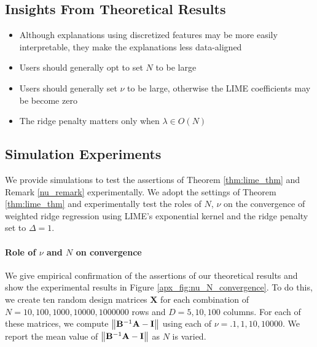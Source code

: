 \documentclass[12pt]{article}  %
\newcommand{\bA}{\mathbf{A}}
\newcommand{\bB}{\mathbf{B}}
\begin{document}
            
        \subsection*{Insights From Theoretical Results}
            \begin{itemize}
                \item Although explanations using discretized features may be more easily interpretable, they make the explanations less data-aligned
                \item Users should generally opt to set $N$ to be large 
                \item Users should generally set $\nu$ to be large, otherwise the LIME coefficients may be become zero
                \item The ridge penalty matters only when $\lambda \in O(N)$
            \end{itemize}
    
            \subsection*{Simulation Experiments}
                \label{apx_sec:simulation_experiments}
                We provide simulations to test the assertions of Theorem \ref{thm:lime_thm} and Remark \ref{nu_remark} experimentally. We adopt the settings of Theorem \ref{thm:lime_thm} and experimentally test the roles of $N$, $\nu$ on the convergence of weighted ridge regression using LIME's exponential kernel and the ridge penalty set to $\Delta=1$.%
    

                
                \paragraph{Role of $\nu$ and $N$ on convergence}
                    We give empirical confirmation of the assertions of our theoretical results and show the experimental results in Figure \ref{apx_fig:nu_N_convergence}. To do this, we create ten random design matrices $\mathbf{X}$ for each combination of $N=10,100,1000,10000,1000000$ rows and $D=5,10,100$ columns. For each of these matrices, we compute $\norm{\bB^{-1}\bA - \mathbf{I}}$ using each of $\nu=.1,1,10,10000$. We report the mean value of $\norm{\bB^{-1}\bA - \mathbf{I}}$ as $N$ is varied.
\end{document}
